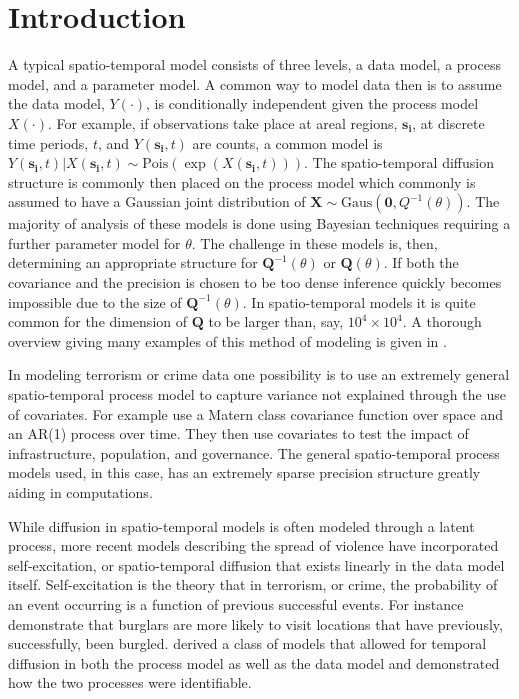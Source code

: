 \documentclass[11pt]{isuthesis}
\begin{document}
\section{Introduction} 
A typical spatio-temporal model consists of three levels, a data model, a process model, and a parameter model.  A common way to model data then is to assume the data model, $Y(\cdot)$, is conditionally independent given the process model $X(\cdot)$. For example, if observations take place at areal regions, $\boldsymbol{s_i}$, at discrete time periods, $t$, and $Y(\boldsymbol{s_i},t)$ are counts, a common model is $Y(\boldsymbol{s_i},t)|X(\boldsymbol{s_i},t)\sim \mbox{Pois}(\exp(X(\boldsymbol{s_i},t)))$.  The spatio-temporal diffusion structure is commonly then placed on the process model which commonly is assumed to have a Gaussian joint distribution of $\boldsymbol{X}\sim \mbox{Gaus}(\boldsymbol{0},Q^{-1}(\theta))$.  The majority of analysis of these models is done using Bayesian techniques requiring a further parameter model for $\theta$.  The challenge in these models is, then, determining an appropriate structure for $\boldsymbol{Q}^{-1}(\theta)$ or $\boldsymbol{Q}(\theta)$.  If both the covariance and the precision is chosen to be too dense inference quickly becomes impossible due to the size of $\boldsymbol{Q}^{-1}(\theta)$.  In spatio-temporal models it is quite common for the dimension of $\boldsymbol{Q}$ to be larger than, say, $10^4\times 10^4$.  A thorough overview giving many examples of this method of modeling is given in \cite{cressie2015statistics}.

In modeling terrorism or crime data one possibility is to use an extremely general spatio-temporal process model to capture variance not explained through the use of covariates.  For example \cite{python2016bayesian} use a Matern class covariance function over space and an AR(1) process over time.  They then use covariates to test the impact of infrastructure, population, and governance.  The general spatio-temporal process models used, in this case, has an extremely sparse precision structure greatly aiding in computations.

While diffusion in spatio-temporal models is often modeled through a latent process, more recent models describing the spread of violence have incorporated self-excitation, or spatio-temporal diffusion that exists linearly in the data model itself.  Self-excitation is the theory that in terrorism, or crime, the probability of an event occurring is a function of previous successful events.  For instance \cite{mohler2011self} demonstrate that burglars are more likely to visit locations that have previously, successfully, been burgled.  \cite{mohler2013modeling} derived a class of models that allowed for temporal diffusion in both the process model as well as the data model and demonstrated how the two processes were identifiable.
\end{document}
